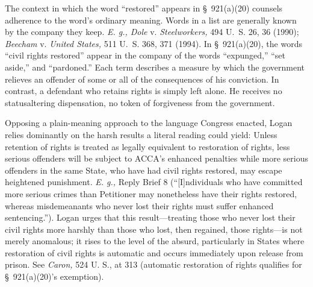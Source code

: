   The context in which the word ``restored'' appears in \S~921(a)(20) counsels adherence to the word's ordinary meaning. Words in a list are generally known by the company they keep. \emph{E. g., Dole} v. \emph{Steelworkers,} 494 U.~S. 26, 36 \newpage  (1990); \emph{Beecham} v. \emph{United States,} 511 U.~S. 368, 371 (1994). In \S~921(a)(20), the words ``civil rights restored'' appear in the company of the words ``expunged,'' ``set aside,'' and ``pardoned.'' Each term describes a measure by which the government relieves an offender of some or all of the consequences of his conviction. In contrast, a defendant who retains rights is simply left alone. He receives no statusaltering dispensation, no token of forgiveness from the government.


  Opposing a plain-meaning approach to the language Congress enacted, Logan relies dominantly on the harsh results a literal reading could yield: Unless retention of rights is treated as legally equivalent to restoration of rights, less serious offenders will be subject to ACCA's enhanced penalties while more serious offenders in the same State, who have had civil rights restored, may escape heightened punishment. \emph{E. g.,} Reply Brief 8 (``[I]ndividuals who have committed more serious crimes than Petitioner may nonetheless have their rights restored, whereas misdemeanants who never lost their rights must suffer enhanced sentencing.''). Logan urges that this result---treating those who never lost their civil rights more harshly than those who lost, then regained, those rights---is not merely anomalous; it rises to the level of the absurd, particularly in States where restoration of civil rights is automatic and occurs immediately upon release from prison. See \emph{Caron,} 524 U. S., at 313 (automatic restoration of rights qualifies for \S~921(a)(20)'s exemption).

